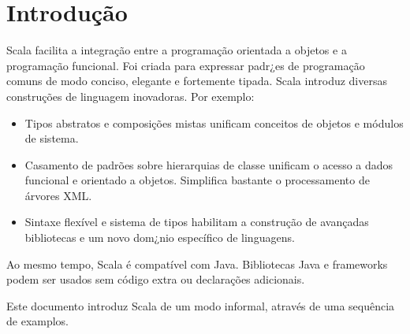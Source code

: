 \documentclass[a4paper,12pt,twoside,titlepage]{book}
\begin{document}
\frontmatter
\makedoctitle
\clearemptydoublepage
\tableofcontents
\mainmatter
\sloppy

\chapter{\label{chap:intro}Introdução}
Scala facilita a integração entre a  programação orientada a objetos e a programação funcional.
Foi criada para expressar padr¿es de programação comuns de modo conciso, elegante e fortemente tipada. 
Scala introduz diversas construções de linguagem inovadoras. Por exemplo:
\begin{itemize}

\item 
Tipos abstratos e composições mistas unificam conceitos de objetos e módulos de sistema.
\item 
Casamento de padrões sobre hierarquias de classe unificam o acesso a dados funcional e orientado a 
objetos. Simplifica bastante o processamento de árvores XML.
\item
Sintaxe flexível e sistema de tipos habilitam a construção de avançadas 
bibliotecas e um novo dom¿nio específico de linguagens.
\end{itemize}



Ao mesmo tempo, Scala é compatível com Java. Bibliotecas Java e frameworks
podem ser usados sem código extra ou declarações adicionais.

Este documento introduz Scala de um modo informal, através de uma sequência
de examplos.


\end{document}

